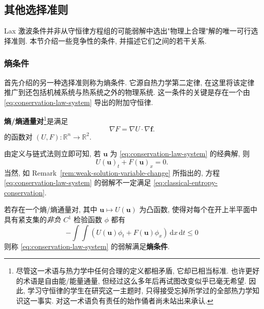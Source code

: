 \subsection{其他选择准则}\label{sec:entropy-selection-criteria}

Lax 激波条件并非从守恒律方程组的可能弱解中选出"物理上合理"解的唯一可行选择准则. 本节介绍一些竞争性的条件, 并描述它们之间的若干关系.

\subsubsection{熵条件}\label{subsec:entropy-condition}

首先介绍的另一种选择准则称为熵条件. 它源自热力学第二定律, 在这里将该定律推广到还包括机械系统与热系统之外的物理系统. 这一条件的关键是存在一个由 \eqref{eq:conservation-law-system} 导出的附加守恒律.

\begin{Definition}
\label{def:entropy-flux-pair}
\textbf{熵/熵通量对}\footnote{尽管这一术语与热力学中任何合理的定义都相矛盾, 它却已相当标准. 也许更好的术语是自由能/能量通量, 但经过这么多年后再试图改变似乎已毫无希望. 因此, 学习守恒律的学生在研究这一主题时, 只得接受忘掉所学过的全部热力学知识这一事实. 对这一术语负有责任的始作俑者尚未站出来承认.}是满足
\begin{equation}\label{eq:entropy-flux-pair-definition}
\nabla F=\nabla U\cdot\nabla\bm{f}.
\end{equation}
的函数对 $(U,F):\mathbb{R}^n\to\mathbb{R}^2$.
\end{Definition}

由定义与链式法则立即可知, 若 $\bm{u}$ 为 \eqref{eq:conservation-law-system} 的经典解, 则
\begin{equation}\label{eq:classical-entropy-conservation}
U(\bm{u})_t+F(\bm{u})_x=0.
\end{equation}
当然, 如 Remark~\ref{rem:weak-solution-variable-change} 所指出的, 方程 \eqref{eq:conservation-law-system} 的弱解不一定满足 \eqref{eq:classical-entropy-conservation}.

\begin{Definition}
\label{def:entropy-condition}
若存在一个熵/熵通量对, 其中 $\bm{u}\mapsto U(\bm{u})$ 为凸函数, 使得对每个在开上半平面中具有紧支集的\emph{非负} $C^1$ 检验函数 $\phi$ 都有
\begin{equation}\label{eq:entropy-weak-inequality}
-\int\!\!\int(U(\bm{u})\phi_t+F(\bm{u})\phi_x)\,\mathrm{d}x\,\mathrm{d}t\leq0
\end{equation}
则称 \eqref{eq:conservation-law-system} 的弱解满足\textbf{熵条件}.
\end{Definition}

